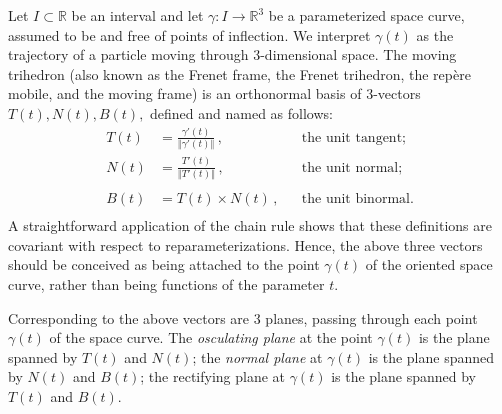 \documentclass[12pt]{article}
\newcommand{\reals}{\mathbb{R}}
\begin{document}
Let $I\subset \reals$ be an interval and let $\gamma:I\to\reals^3$ be a
parameterized space curve, assumed to be
 and free of points of inflection. We
interpret $\gamma(t)$ as the trajectory of a particle moving through
3-dimensional space.  The moving trihedron (also known as the Frenet
frame, the Frenet trihedron, the rep\`ere mobile, and the moving
frame) is an orthonormal basis of 3-vectors $T(t),N(t),B(t),$ defined
and named as follows:
\begin{align*}
  T(t) &= \displaystyle \frac{\gamma'(t)}{\Vert \gamma'(t) \Vert}\, ,
  &&
  \text{the unit  tangent;}\\
  N(t) &= \displaystyle \frac{T'(t)}{\Vert T'(t) \Vert} \, ,&&
  \text{the unit normal;}\\ \\
  B(t) &= T(t)\times N(t)  \, ,&& \text{the unit binormal.}\\
\end{align*}
A straightforward application of the chain rule shows that these
definitions are covariant with respect to reparameterizations.  Hence,
the above three vectors should be conceived as being attached to the
point $\gamma(t)$ of the oriented space curve, rather than being
functions of the parameter $t$.

Corresponding to the above vectors are 3 planes, passing through each
point $\gamma(t)$ of the space curve.  The \emph{osculating plane} at
the point $\gamma(t)$ is the plane spanned by $T(t)$ and $N(t)$; the
\emph{normal plane} at $\gamma(t)$ is the plane spanned by $N(t)$ and
$B(t)$; the rectifying plane at $\gamma(t)$ is the plane spanned by
$T(t)$ and $B(t)$.
\end{document}
